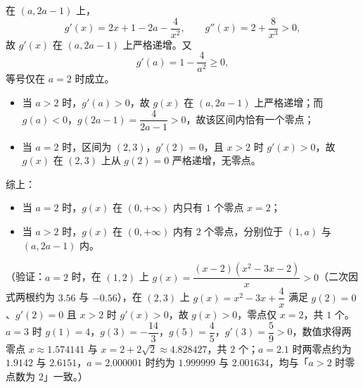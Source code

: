 \begin{answer}
在 \((a,2a-1)\) 上，
\nopagebreak[4]
\[
g'(x)=2x+1-2a-\dfrac4{x^2},\qquad g''(x)=2+\dfrac8{x^3}>0,
\]
故 \(g'(x)\) 在 \((a,2a-1)\) 上严格递增。又
\nopagebreak[4]
\[
g'(a)=1-\dfrac4{a^2}\geqslant0,
\]
等号仅在 \(a=2\) 时成立。

\begin{itemize}
\item 当 \(a>2\) 时，\(g'(a)>0\)，故 \(g(x)\) 在 \((a,2a-1)\) 上严格递增；而 \(g(a)<0\)，\(g(2a-1)=\dfrac4{2a-1}>0\)，故该区间内恰有一个零点；
\item 当 \(a=2\) 时，区间为 \((2,3)\)，\(g'(2)=0\)，且 \(x>2\) 时 \(g'(x)>0\)，故 \(g(x)\) 在 \((2,3)\) 上从 \(g(2)=0\) 严格递增，无零点。
\end{itemize}

综上：

\begin{itemize}
\item 当 \(a=2\) 时，\(g(x)\) 在 \((0,+\infty)\) 内只有 \(1\) 个零点 \(x=2\)；
\item 当 \(a>2\) 时，\(g(x)\) 在 \((0,+\infty)\) 内有 \(2\) 个零点，分别位于 \((1,a)\) 与 \((a,2a-1)\) 内。
\end{itemize}

（验证：\(a=2\) 时，在 \((1,2)\) 上 \(g(x)=\dfrac{(x-2)(x^2-3x-2)}{x}>0\)（二次因式两根约为 \(3.56\) 与 \(-0.56\)），在 \((2,3)\) 上 \(g(x)=x^2-3x+\dfrac4x\) 满足 \(g(2)=0\)、\(g'(2)=0\) 且 \(x>2\) 时 \(g'(x)>0\)，故 \(g(x)>0\)，零点仅 \(x=2\)，共 \(1\) 个。\(a=3\) 时 \(g(1)=4\)，\(g(3)=-\dfrac{14}{3}\)，\(g(5)=\dfrac45\)，\(g'(3)=\dfrac59>0\)，数值求得两零点 \(x\approx1.574141\) 与 \(x=2+2\sqrt2\approx4.828427\)，共 \(2\) 个；\(a=2.1\) 时两零点约为 \(1.9142\) 与 \(2.6151\)，\(a=2.000001\) 时约为 \(1.999999\) 与 \(2.001634\)，均与「\(a>2\) 时零点数为 \(2\)」一致。）




\end{answer}